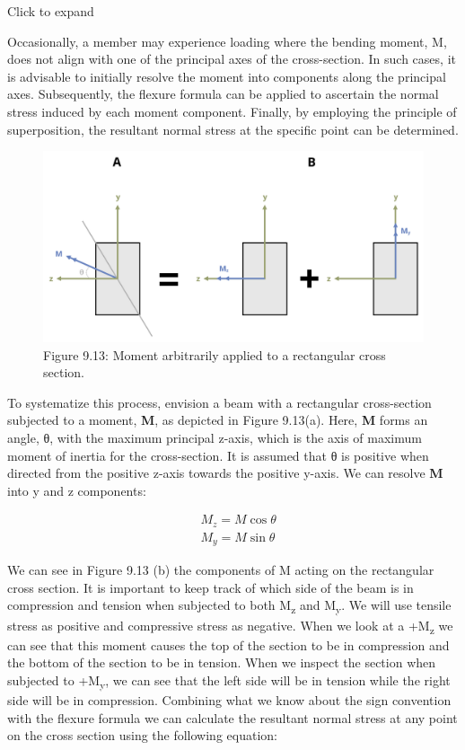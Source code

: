 \documentclass[
  letterpaper,
  DIV=11,
  numbers=noendperiod]{scrreprt}
\theoremstyle{definition}
\theoremstyle{remark}
\begin{document}
Click to expand

Occasionally, a member may experience loading where the bending moment,
M, does not align with one of the principal axes of the cross-section.
In such cases, it is advisable to initially resolve the moment into
components along the principal axes. Subsequently, the flexure formula
can be applied to ascertain the normal stress induced by each moment
component. Finally, by employing the principle of superposition, the
resultant normal stress at the specific point can be determined.

\begin{figure}[H]

{\centering \includegraphics{images/CH9 PNGs/Figure 9.13.png}

}

\caption{Figure 9.13: Moment arbitrarily applied to a rectangular cross
section.}

\end{figure}%

To systematize this process, envision a beam with a rectangular
cross-section subjected to a moment, \textbf{M}, as depicted in Figure
9.13(a). Here, \textbf{M} forms an angle, θ, with the maximum principal
z-axis, which is the axis of maximum moment of inertia for the
cross-section. It is assumed that θ is positive when directed from the
positive z-axis towards the positive y-axis. We can resolve \textbf{M}
into y and z components:

\[
\begin{aligned}
& M_z=M \cos \theta \\
& M_y=M \sin \theta
\end{aligned}
\]

We can see in Figure 9.13 (b) the components of M acting on the
rectangular cross section. It is important to keep track of which side
of the beam is in compression and tension when subjected to both
M\textsubscript{z} and M\textsubscript{y}. We will use tensile stress as
positive and compressive stress as negative. When we look at a
+M\textsubscript{z} we can see that this moment causes the top of the
section to be in compression and the bottom of the section to be in
tension. When we inspect the section when subjected to
+M\textsubscript{y}, we can see that the left side will be in tension
while the right side will be in compression. Combining what we know
about the sign convention with the flexure formula we can calculate the
resultant normal stress at any point on the cross section using the
following equation:
\end{document}
